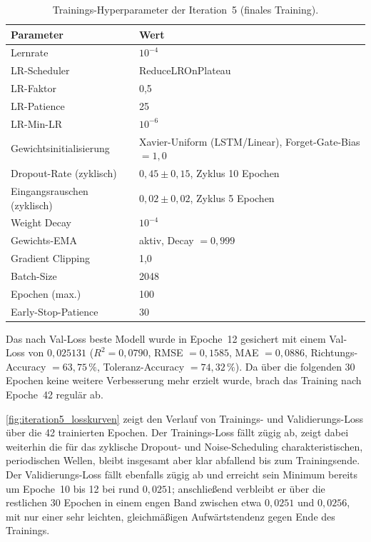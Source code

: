 \begin{table}[h]
    \centering
    \caption{Trainings-Hyperparameter der Iteration~5 (finales Training).}
    \label{tab:iteration5_config}
    \begin{tabular}{ll}
        \toprule
        \textbf{Parameter} & \textbf{Wert} \\
        \midrule
        Lernrate                 & $10^{-4}$ \\
        LR-Scheduler             & ReduceLROnPlateau \\
        LR-Faktor                & 0{,}5 \\
        LR-Patience              & 25 \\
        LR-Min-LR                & $10^{-6}$ \\
        Gewichtsinitialisierung  & Xavier-Uniform (LSTM/Linear), Forget-Gate-Bias $= 1{,}0$ \\
        Dropout-Rate (zyklisch)  & $0{,}45 \pm 0{,}15$, Zyklus 10 Epochen \\
        Eingangsrauschen (zyklisch) & $0{,}02 \pm 0{,}02$, Zyklus 5 Epochen \\
        Weight Decay             & $10^{-4}$ \\
        Gewichts-EMA             & aktiv, Decay $= 0{,}999$ \\
        Gradient Clipping        & 1{,}0 \\
        Batch-Size               & 2048 \\
        Epochen (max.)           & 100 \\
        Early-Stop-Patience      & 30 \\
        \bottomrule
    \end{tabular}
\end{table}

Das nach Val-Loss beste Modell wurde in Epoche~12 gesichert mit einem Val-Loss von $0{,}025131$ ($R^2 = 0{,}0790$, RMSE $= 0{,}1585$, MAE $= 0{,}0886$, Richtungs-Accuracy $= 63{,}75\,\%$, Toleranz-Accuracy $= 74{,}32\,\%$). Da über die folgenden 30 Epochen keine weitere Verbesserung mehr erzielt wurde, brach das Training nach Epoche~42 regulär ab.

\autoref{fig:iteration5_losskurven} zeigt den Verlauf von Trainings- und Validierungs-Loss über die 42 trainierten Epochen. Der Trainings-Loss fällt zügig ab, zeigt dabei weiterhin die für das zyklische Dropout- und Noise-Scheduling charakteristischen, periodischen Wellen, bleibt insgesamt aber klar abfallend bis zum Trainingsende. Der Validierungs-Loss fällt ebenfalls zügig ab und erreicht sein Minimum bereits um Epoche~10 bis 12 bei rund $0{,}0251$; anschließend verbleibt er über die restlichen 30 Epochen in einem engen Band zwischen etwa $0{,}0251$ und $0{,}0256$, mit nur einer sehr leichten, gleichmäßigen Aufwärtstendenz gegen Ende des Trainings.

